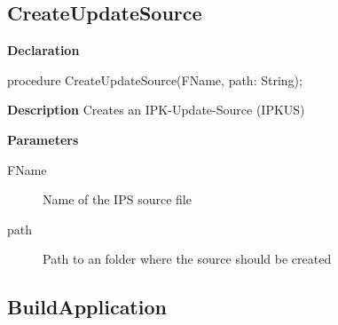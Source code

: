 \documentclass{report}
\newif\ifpdf
\begin{document}
\subsection*{CreateUpdateSource}
\fi
\label{ipkbuild-CreateUpdateSource}
\begin{list}{}{
\setlength{\itemindent}{0cm}
\setlength{\listparindent}{0cm}
\setlength{\leftmargin}{\evensidemargin}
\addtolength{\leftmargin}{\tmplength}
\settowidth{\labelsep}{X}
\addtolength{\leftmargin}{\labelsep}
\setlength{\labelwidth}{\tmplength}
}
\item[\textbf{Declaration}\hfill]
\ifpdf
\begin{flushleft}
\fi
\begin{ttfamily}
procedure CreateUpdateSource(FName, path: String);\end{ttfamily}

\ifpdf
\end{flushleft}
\fi

\par
\item[\textbf{Description}]
Creates an IPK{-}Update{-}Source (IPKUS)  \par
\item[\textbf{Parameters}]
\begin{description}
\item[FName] Name of the IPS source file
\item[path] Path to an folder where the source should be created
\end{description}


\end{list}
\ifpdf
\subsection*{\large{\textbf{BuildApplication}}\normalsize\hspace{1ex}\hrulefill}
\else
\end{document}
